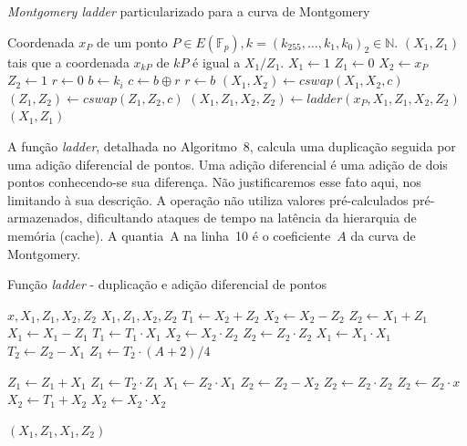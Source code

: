\documentclass{SBCbookchapter}
\begin{document}
\begin{algorithm}[H]
\caption{\emph{Montgomery ladder} particularizado para a curva de Montgomery}
\begin{algorithmic}[1]
    \REQUIRE Coordenada $x_P$ de um ponto $P\in E(\mathbb{F}_p), k=(k_{255},\ldots,k_1,k_0)_2 \in \mathbb{N}$.
    \ENSURE $(X_1,Z_1)$ tais que a coordenada $x_{kP}$ de $kP$ é igual a $X_1/Z_1$. 
    \STATE $X_1 \leftarrow 1$
    \STATE $Z_1 \leftarrow 0$
    \STATE $X_2 \leftarrow x_P$
    \STATE $Z_2 \leftarrow 1$
    \STATE $r \leftarrow 0$
        \STATE $b \leftarrow k_i$
        \STATE $c \leftarrow b \oplus r$
        \STATE $r \leftarrow b$
        \STATE $(X_1, X_2) \leftarrow cswap(X_1,X_2,c)$
        \STATE $(Z_1,Z_2) \leftarrow cswap(Z_1,Z_2,c)$
        \STATE $(X_1, Z_1, X_2, Z_2) \leftarrow ladder(x_P, X_1, Z_1, X_2, Z_2)$
    \ENDFOR
    \RETURN $(X_1,Z_1)$
    \end{algorithmic}
\end{algorithm}

A função \emph{ladder}, detalhada no Algoritmo~8, calcula uma duplicação seguida por uma adição diferencial de pontos. Uma adição diferencial é uma adição de dois  pontos conhecendo-se sua diferença. Não justificaremos esse fato aqui, nos limitando à sua descrição. A operação não utiliza valores pré-calculados pré-armazenados, dificultando ataques de tempo na latência da hierarquia de memória (cache). A quantia~A na linha~10 é o coeficiente~$A$ da curva de Montgomery.

\begin{algorithm}[H]
\caption{Função \emph{ladder} - duplicação e adição diferencial de pontos}
\begin{multicols}{2}
\begin{algorithmic}[1]
    \REQUIRE $x, X_1, Z_1, X_2, Z_2$
    \ENSURE $X_1, Z_1, X_2, Z_2$
    \STATE $T_1 \leftarrow X_2 + Z_2$
    \STATE $X_2 \leftarrow X_2 - Z_2$
    \STATE $Z_2 \leftarrow X_1 + Z_1$
    \STATE $X_1 \leftarrow X_1 - Z_1$
    \STATE $T_1 \leftarrow T_1 \cdot X_1$
    \STATE $X_2 \leftarrow X_2 \cdot Z_2$
    \STATE $Z_2 \leftarrow Z_2 \cdot Z_2$
    \STATE $X_1 \leftarrow X_1 \cdot X_1$
    \STATE $T_2 \leftarrow Z_2 - X_1$
    \STATE $Z_1 \leftarrow T_2 \cdot (A+2)/4$
    
    
    \STATE $Z_1 \leftarrow Z_1 + X_1$
    \STATE $Z_1 \leftarrow T_2 \cdot Z_1$
    \STATE $X_1 \leftarrow Z_2 \cdot X_1$
    \STATE $Z_2 \leftarrow Z_2 - X_2$
    \STATE $Z_2 \leftarrow Z_2 \cdot Z_2$
    \STATE $Z_2 \leftarrow Z_2 \cdot x$
    \STATE $X_2 \leftarrow T_1 + X_2$
    \STATE $X_2 \leftarrow X_2 \cdot X_2$
    
    \RETURN $(X_1,Z_1,X_1,Z_2)$
\end{algorithmic}
\end{multicols}
\end{algorithm}
\end{document}
